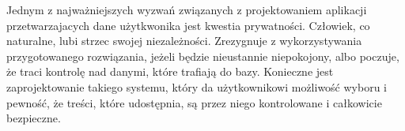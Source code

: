 Jednym z najważniejszych wyzwań związanych z projektowaniem aplikacji przetwarzajacych dane użytkwonika jest kwestia prywatności. Człowiek, co naturalne, lubi strzec swojej niezależności. Zrezygnuje z wykorzystywania przygotowanego rozwiązania, jeżeli będzie nieustannie niepokojony, albo poczuje, że traci kontrolę nad danymi, które trafiają do bazy. Konieczne jest zaprojektowanie takiego systemu, który da użytkownikowi możliwość wyboru i pewność, że treści, które udostępnia, są przez niego kontrolowane i całkowicie bezpieczne.